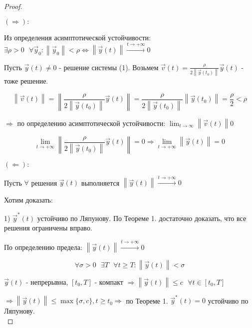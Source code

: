 \documentclass[12pt, a4paper]{report}
\begin{document}
\begin{proof} \(  \) 

    \( (\Rightarrow): \) 

    Из определения асимптотической устойчивости: \( \exists  \rho> 0 \text{ }  \forall  \vec{y } _ 0 : \left\lVert \vec{y }  _0 \right\rVert < \rho \Leftrightarrow  \left\lVert \vec{y } (t) \right\rVert \xrightarrow{t \to  + \infty } 0   \) 

    Пусть \( \vec{y } (t)\neq 0  \)  - решение системы (1). Возьмем \( \vec{v } (t) =\displaystyle  \frac{ \rho }{2 \left\lVert \vec{y } (t_0) \right\rVert} \vec{y } (t)  \)  - тоже решение. 

    \[ \left\lVert \vec{v }  (t ) \right\rVert = \left\lVert \frac{\rho}{2 \left\lVert \vec{y } (t_0) \right\rVert} \vec{y } (t)   \right\rVert = \frac{\rho}{ 2 \left\lVert \vec{y } (t_0)  \right\rVert} \left\lVert \vec{y } (t_0) \right\rVert = \frac{\rho}{2 }  <\rho \] 

    \( \Rightarrow \) по определению асимптотической устойчивости: \( \displaystyle \lim_{t \to \infty } \left\lVert \vec{v} (t)  \right\rVert 0  \) 

    \[ \lim_{t  \to +\infty} \left\lVert \frac{\rho}{2 \left\lVert \vec{y } (t_0) \right\rVert } \vec{y} (t)  \right\rVert = 0 \Rightarrow \lim_{t \to +\infty}  \left\lVert \vec{y } (t) \right\rVert = 0 \] 

    \( (\Leftarrow): \) 

    Пусть \( \forall   \) решения \( \vec{y } (t) \)  выполняется \( \displaystyle \left\lVert \vec{y } (t) \right\rVert \xrightarrow{ t \to  + \infty } 0    \) 

    Хотим доказать:
    
    1) \( \vec{y } ^* (t)  \) устойчиво по Ляпунову. По Теореме 1. достаточно доказать, что все решения ограничены вправо. 

    По определению предела: \( \displaystyle  \left\lVert \vec{y } (t ) \right\rVert \xrightarrow{ t \to  +\infty } 0   \) 

    \[ \forall  \sigma > 0 \text{ }  \exists  T \text{ }  \forall  t \ge  T : \left\lVert \vec{y } (t) \right\rVert < \sigma \]  

    \( \vec{y } (t) \) - непрерывна, \( [t_0, T] \) - компакт \( \Rightarrow \left\lVert \vec{y } (t) \right\rVert \le  c \text{ }  \forall  t \in  [t_0 , T] \) 

    \( \Rightarrow \left\lVert  \vec{y } (t) \right\rVert \le  \max  \{\sigma, c \} , t \ge  t_0 \Rightarrow  \)  по Теореме 1. \( \vec{y } ^* (t ) = 0  \) устойчиво по Ляпунову. \\


\end{proof}
\end{document}

